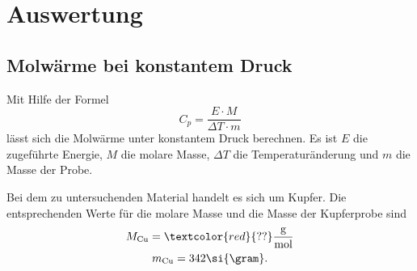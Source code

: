 \section{Auswertung}
\subsection{Molwärme bei konstantem Druck}
Mit Hilfe der Formel
\begin{equation}
  C_p = \frac{E \cdot M}{\Delta T \cdot m}
\end{equation}
lässt sich die Molwärme unter konstantem Druck berechnen.
Es ist $E$ die zugeführte Energie, $M$ die molare Masse, $\Delta T$ die Temperaturänderung und $m$ die Masse der Probe.

Bei dem zu untersuchenden Material handelt es sich um Kupfer.
Die entsprechenden Werte für die molare Masse und die Masse der Kupferprobe sind
\begin{gather*}
  M_{\text{Cu}} = \textcolor{red}{??}\frac{\text{g}}{\text{mol}} \\%
  m_{\text{Cu}} = 342\si{\gram}.
\end{gather*}
